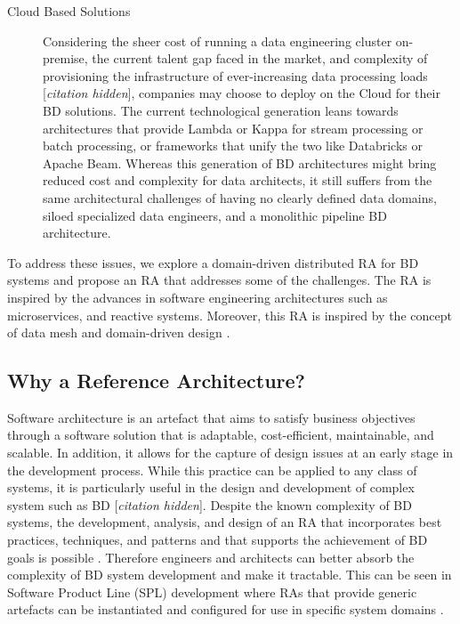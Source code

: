 \documentclass[a4paper,11pt]{article}
\let\cite\citep
\newcommand{\hc}{[\textit{citation hidden}]\textnormal{}}
\begin{document}
\begin{description}
    \item[Cloud Based Solutions] Considering the sheer cost of running a data engineering cluster on-premise, the current talent gap faced in the market, and complexity of provisioning the infrastructure of ever-increasing data processing loads 
    \hc{},
     companies may choose to deploy on the Cloud for their BD solutions. The current technological generation leans towards architectures that provide Lambda or Kappa for stream processing or batch processing, or frameworks that unify the two like Databricks or Apache Beam. Whereas this generation of BD architectures might bring reduced cost and complexity for data architects, it still suffers from the same architectural challenges of having no clearly defined data domains, siloed specialized data engineers, and a monolithic pipeline BD architecture.
\end{description}

To address these issues, we explore a domain-driven distributed RA for BD systems and propose an RA that addresses some of the challenges. The RA is inspired by the advances in software engineering architectures such as microservices, and reactive systems. Moreover, this RA is inspired by the concept of data mesh \citep{dataMeshBook} and domain-driven design \citep{evans2004domain}.


\subsection{Why a Reference Architecture?}
Software architecture is an artefact that aims to satisfy business objectives through a software solution that is adaptable, cost-efficient, maintainable, and scalable. In addition, it allows for the capture of design issues at an early stage in the development process. While this practice can be applied to any class of systems, it is particularly useful in the design and development of complex system such as BD 
\hc{}.
 Despite the known complexity of BD systems, the development, analysis, and design of an RA that incorporates best practices, techniques, and patterns and that supports the achievement of BD goals is possible \cite{ataei2022state}. Therefore engineers and architects can better absorb the complexity of BD system development and make it tractable. This can be seen in Software Product Line (SPL) development where RAs that provide generic artefacts can be instantiated and configured for use in specific system domains \cite{Derras,Cloutier}.
\end{document}
